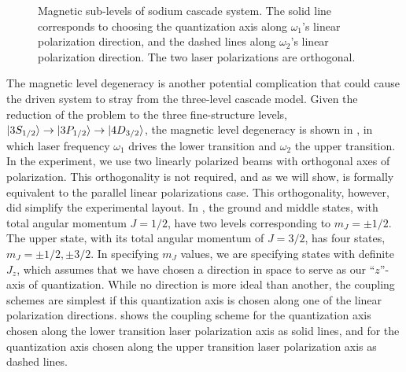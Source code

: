 \begin{figure}[tbp]
\bigskip
{}
{Magnetic sub-levels of sodium cascade system.  The solid line corresponds
to choosing the quantization axis along $\omega_1$'s linear polarization
direction, and the dashed lines along $\omega_2$'s linear polarization
direction.  The two laser polarizations are orthogonal.
\label{mJ_levels}}
\end{figure}

The magnetic level degeneracy is another potential complication that could
cause the driven system to stray from the three-level cascade model.  Given the
reduction of the problem to the three fine-structure levels, $\vert 3S_{1/2} \rangle
\rightarrow \vert 3P_{1/2} \rangle \rightarrow \vert 4D_{3/2} \rangle$, the magnetic level
degeneracy is shown in , in which laser frequency $\omega_1$
drives the lower transition and $\omega_2$ the upper transition.  In the
experiment, we use two linearly polarized beams with orthogonal axes of
polarization.  This orthogonality is not required, and as we will
show, is formally equivalent to the parallel linear polarizations case.  This
orthogonality, however, did simplify the experimental layout.  In
, the ground and middle states, with total angular momentum
$J=1/2$, have two levels corresponding to $m_J = \pm 1/2$.  The upper state, with
its total angular momentum of $J=3/2$, has four states, $m_J = \pm 1/2,\pm
3/2$.  In specifying $m_J$ values, we are specifying states with definite $J_z$,
which assumes that we have chosen a direction in space to serve as our
``$z$''-axis of quantization.  While no direction is more ideal than another,
the coupling schemes are simplest if this quantization axis is chosen along one
of the linear polarization directions.   shows the coupling
scheme for the quantization axis chosen along the lower transition laser
polarization axis as solid lines, and for the quantization axis
chosen along the upper transition laser polarization axis as dashed lines.

